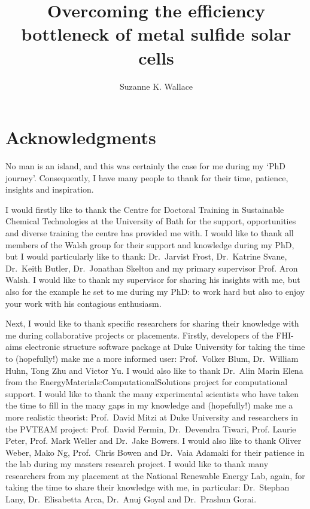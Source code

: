 \documentclass[11pt, twoside]{report}
\title{Overcoming the efficiency bottleneck of metal sulfide solar cells}
\author{Suzanne K. Wallace}
\begin{document}
\maketitle
%

\section*{Acknowledgments}
No man is an island, and this was certainly the case for me during my `PhD journey'. Consequently, I have many people to thank for their time, patience, insights and inspiration. 

I would firstly like to thank the Centre for Doctoral Training in Sustainable Chemical Technologies at the University of Bath for the support, opportunities and diverse training the centre has provided me with. I would like to thank all members of the Walsh group for their support and knowledge during my PhD, but I would particularly like to thank: Dr.~Jarvist Frost, Dr.~Katrine Svane, Dr.~Keith Butler, Dr.~Jonathan Skelton and my primary supervisor Prof. Aron Walsh. I would like to thank my supervisor for sharing his insights with me, but also for the example he set to me during my PhD: to work hard but also to enjoy your work with his contagious enthusiasm.

Next, I would like to thank specific researchers for sharing their knowledge with me during collaborative projects or placements. Firstly, developers of the FHI-aims electronic structure software package at Duke University for taking the time to (hopefully!) make me a more informed user: Prof.~Volker Blum, Dr.~William Huhn, Tong Zhu and Victor Yu. I would also like to thank Dr.~Alin Marin Elena from the EnergyMaterials:ComputationalSolutions project for computational support. I would like to thank the many experimental scientists who have taken the time to fill in the many gaps in my knowledge and (hopefully!) make me a more realistic theorist: Prof.~David Mitzi at Duke University and researchers in the PVTEAM project: Prof.~David Fermin, Dr.~Devendra Tiwari, Prof. Laurie Peter, Prof. Mark Weller and Dr.~Jake Bowers. 
I would also like to thank Oliver Weber, Mako Ng, Prof.~Chris Bowen and Dr.~Vaia Adamaki for their patience in the lab during my masters research project.
I would like to thank many researchers from my placement at the National Renewable Energy Lab, again, for taking the time to share their knowledge with me, in particular: Dr.~Stephan Lany, Dr.~Elisabetta Arca, Dr.~Anuj Goyal and Dr.~Prashun Gorai. 
\end{document}
